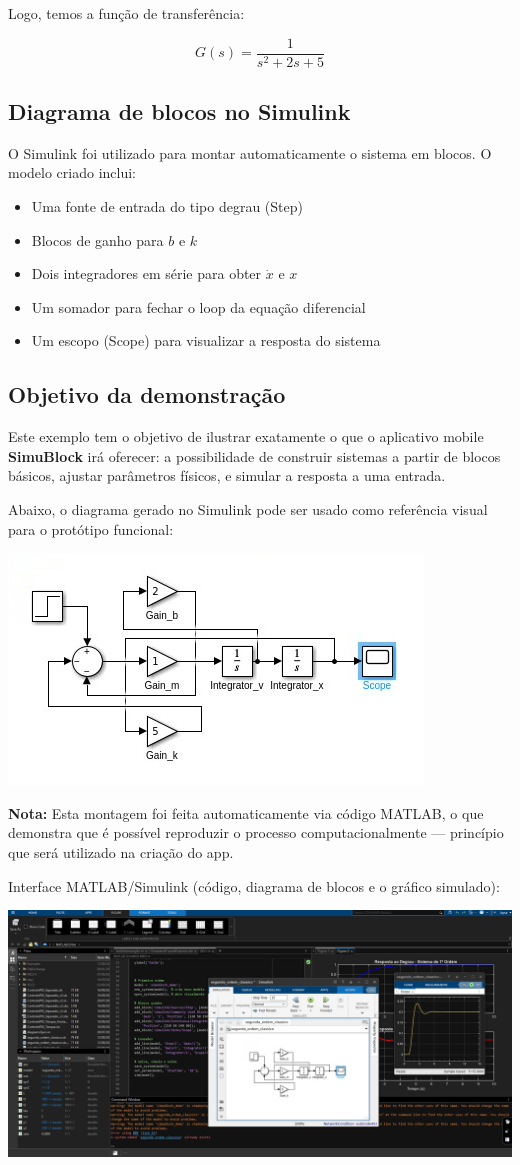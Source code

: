 \documentclass[12pt]{article}
\begin{document}
Logo, temos a função de transferência:

\[
G(s) = \frac{1}{s^2 + 2s + 5}
\]

\subsection*{Diagrama de blocos no Simulink}

O Simulink foi utilizado para montar automaticamente o sistema em blocos. O modelo criado inclui:
\begin{itemize}
    \item Uma fonte de entrada do tipo degrau (Step)
    \item Blocos de ganho para \( b \) e \( k \)
    \item Dois integradores em série para obter \( \dot{x} \) e \( x \)
    \item Um somador para fechar o loop da equação diferencial
    \item Um escopo (Scope) para visualizar a resposta do sistema
\end{itemize}

\subsection*{Objetivo da demonstração}

Este exemplo tem o objetivo de ilustrar exatamente o que o aplicativo mobile \textbf{SimuBlock} irá oferecer: a possibilidade de construir sistemas a partir de blocos básicos, ajustar parâmetros físicos, e simular a resposta a uma entrada.

Abaixo, o diagrama gerado no Simulink pode ser usado como referência visual para o protótipo funcional:

\vspace{0.5cm}
\includegraphics[width=0.7\linewidth]{01.png}
\vspace{0.5cm}

\textbf{Nota:} Esta montagem foi feita automaticamente via código MATLAB, o que demonstra que é possível reproduzir o processo computacionalmente — princípio que será utilizado na criação do app.

Interface MATLAB/Simulink (código, diagrama de blocos e o gráfico simulado):

\vspace{0.5cm}
\centering
\includegraphics[width=1.0\linewidth]{02.png}
\vspace{0.5cm}
\end{document}
